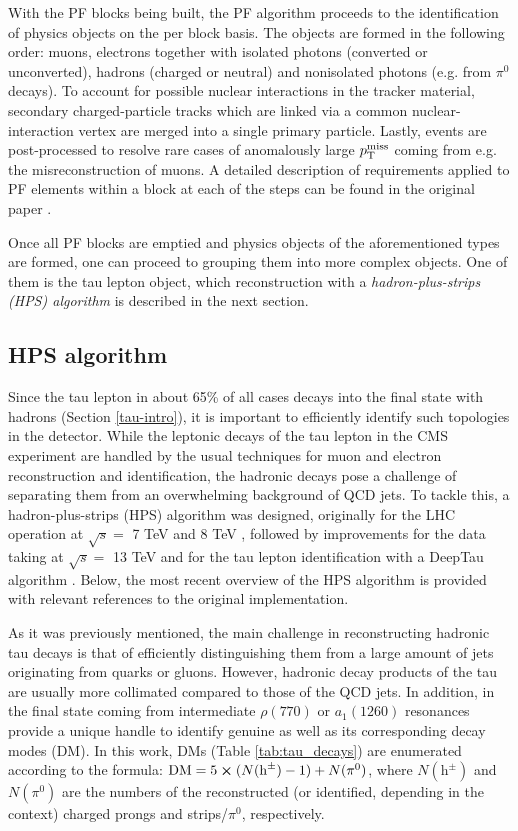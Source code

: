 With the PF blocks being built, the PF algorithm proceeds to the identification of physics objects on the per block basis. The objects are formed in the following order: muons,  electrons together with isolated photons (converted or unconverted), hadrons (charged or neutral) and nonisolated photons (e.g. from $\pi^0$ decays). To account for possible nuclear interactions in the tracker material, secondary charged-particle tracks which are linked via a common nuclear-interaction vertex are merged into a single primary particle. Lastly, events are post-processed to resolve rare cases of anomalously large $p_{\text{T}}^{\text{miss}}$ coming from e.g. the misreconstruction of muons. A detailed description of requirements applied to PF elements within a block at each of the steps can be found in the original paper \cite{CMS:2017yfk}.

Once all PF blocks are emptied and physics objects of the aforementioned types are formed, one can proceed to grouping them into more complex objects. One of them is the tau lepton object, which reconstruction with a \textit{hadron-plus-strips (HPS) algorithm} is described in the next section. 

\subsection{HPS algorithm} \label{hps}

Since the tau lepton in about 65\% of all cases decays into the final state with hadrons (Section \ref{tau-intro}), it is important to efficiently identify such topologies in the detector. While the leptonic decays of the tau lepton in the CMS experiment are handled by the usual techniques for muon \cite{CMS:2018rym} and electron \cite{CMS:2020uim} reconstruction and identification, the hadronic decays pose a challenge of separating them from an overwhelming background of QCD jets. To tackle this, a hadron-plus-strips (HPS) algorithm was designed, originally for the LHC operation at $\sqrt{s} = $ 7 TeV \cite{cms2012performance} and 8 TeV \cite{CMS:2015pac}, followed by improvements for the data taking at $\sqrt{s} = $ 13 TeV \cite{CMS:2018jrd} and for the tau lepton identification with a DeepTau algorithm \cite{CMS:2022prd}. Below, the most recent overview of the HPS algorithm is provided with relevant references to the original implementation.

As it was previously mentioned, the main challenge in reconstructing hadronic tau decays is that of efficiently distinguishing them from a large amount of jets originating from quarks or gluons. However, hadronic decay products of the tau are usually more collimated compared to those of the QCD jets. In addition, \piz in the final state coming from intermediate $\rho(770)$ or $a_1(1260)$ resonances provide a unique handle to identify genuine \tauh as well as its corresponding decay modes (DM). In this work, DMs (Table \ref{tab:tau_decays}) are enumerated according to the formula: $\text{DM} = 5 \cross (N(\text{h}^\pm) - 1) + N(\pi^0)$, where $N(\text{h}^\pm)$ and $N(\pi^0)$ are the numbers of the reconstructed (or identified, depending in the context) charged prongs and strips/$\pi^0$, respectively. 

